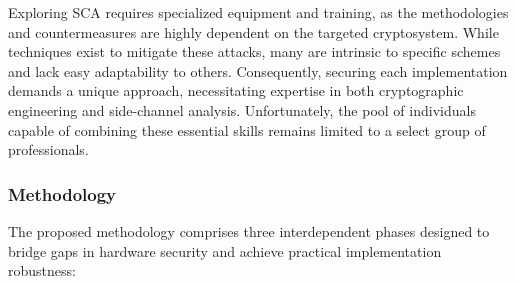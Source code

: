 \documentclass[11pt, a4paper]{article}
\begin{document}
Exploring SCA requires specialized equipment and training, as the 
methodologies and countermeasures are highly dependent on the targeted 
cryptosystem. While techniques exist to mitigate these attacks, many are 
intrinsic to specific schemes and lack easy adaptability to others. Consequently, 
securing each implementation demands a unique approach, necessitating 
expertise in both cryptographic engineering and side-channel analysis. 
Unfortunately, the pool of individuals capable of combining these
essential skills remains limited to a select group of professionals.

\subsubsection*{Methodology}

The proposed methodology comprises three 
interdependent phases designed to bridge gaps 
in hardware security and achieve practical implementation robustness:
\end{document}
